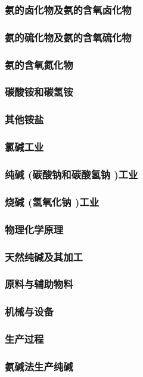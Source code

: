 \documentclass[UTF8]{../../ApplicationUniverse}
\begin{document}
        \subsubsection{氨的卤化物及氨的含氧卤化物}
        \subsubsection{氨的硫化物及氨的含氧硫化物}
        \subsubsection{氨的含氧氮化物}
        \subsubsection{碳酸铵和碳氢铵}
        \subsubsection{其他铵盐}
\subsubsection{氯碱工业}
    \subsubsection{纯碱 (碳酸钠和碳酸氢钠 )工业}
    \subsubsection{烧碱 (氢氧化钠 )工业}
        \subsubsection{物理化学原理}
        \subsubsection{天然纯碱及其加工}
        \subsubsection{原料与辅助物料}
        \subsubsection{机械与设备}
        \subsubsection{生产过程}
            \subsubsection{氨碱法生产纯碱}
\end{document}
